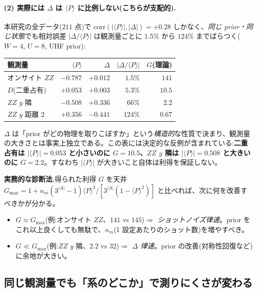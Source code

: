 \documentclass[11pt,a4paper]{ltjsarticle}
\newcommand{\ev}[1]{\langle #1\rangle}
\begin{document}
\paragraph{(2) 実際には $\Delta$ は $\ev{P}$ に比例しない(こちらが支配的).}本研究の全データ($211$ 点)で $\mathrm{corr}(|\ev{P}|,|\Delta|)=+0.28$ しかなく、\emph{同じ prior・同じ状態}でも相対誤差 $|\Delta/\ev{P}|$ は観測量ごとに $1.5\%$ から $124\%$ までばらつく($W=4$, $U=8$, UHF prior):
\begin{center}\small
\begin{tabular}{@{}lrrrr@{}}
\toprule
観測量 & $\ev{P}$ & $\Delta$ & $|\Delta/\ev{P}|$ & $G$(理論) \\
\midrule
オンサイト $ZZ$ & $-0.787$ & $+0.012$ & $1.5\%$ & $141$ \\
$D$(二重占有) & $+0.053$ & $+0.003$ & $5.3\%$ & $10.5$ \\
$ZZ$ $y$ 隣 & $-0.508$ & $+0.336$ & $66\%$ & $2.2$ \\
$ZZ$ $y$ 距離 2 & $+0.356$ & $-0.441$ & $124\%$ & $0.67$ \\
\bottomrule
\end{tabular}
\end{center}
$\Delta$ は「prior がどの物理を取りこぼすか」という\emph{構造的}な性質で決まり、観測量の大きさとは事実上独立である。この表には決定的な反例が含まれている:\textbf{二重占有は $|\ev{P}|=0.053$ と小さいのに $G=10.5$、$ZZ$ $y$ 隣は $|\ev{P}|=0.508$ と大きいのに $G=2.2$}。すなわち $|\ev{P}|$ が大きいこと自体は利得を保証しない。

\begin{keybox}
\textbf{実務的な診断法.}得られた利得 $G$ を天井 $G_{\max}=1+n_m(3^{|A|}-1)\ev{P}^2/[3^{|A|}(1-\ev{P}^2)]$ と比べれば、次に何を改善すべきかが分かる。
\begin{itemize}
  \item $G\approx G_{\max}$(例:オンサイト $ZZ$、$141$ vs $145$)$\Rightarrow$ \emph{ショットノイズ律速}。prior をこれ以上良くしても無駄で、$n_m$(1 設定あたりのショット数)を増やすべき。
  \item $G\ll G_{\max}$(例:$ZZ$ $y$ 隣、$2.2$ vs $32$)$\Rightarrow$ \emph{$\Delta$ 律速}。prior の改善(対称性回復など)に余地が大きい。
\end{itemize}
\end{keybox}

\subsection{同じ観測量でも「系のどこか」で測りにくさが変わる}
\label{sec:sitedep}
\end{document}
